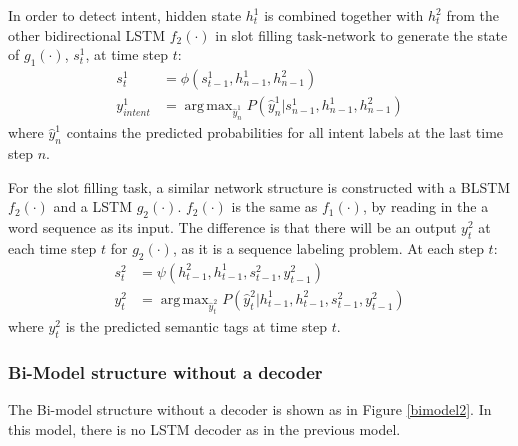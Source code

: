 \documentclass[11pt,a4paper]{article}
\DeclareMathOperator*{\argmax}{arg\,max}
\begin{document}
In order to detect intent, hidden state $h_t^1$ is combined together with $h_t^2$ from the other bidirectional LSTM $f_2(\cdot)$ in slot filling task-network to generate the state of $g_1(\cdot)$, $s_t^1$, at time step $t$:
\begin{equation}
\begin{split}
s_t^1&=\phi(s_{t-1}^1,h^1_{n-1},h^2_{n-1})\\
y_{intent}^1&=\argmax_{\hat{y}_n^{1}} P(\hat{y}_n^{1}|s_{n-1}^1,h^1_{n-1},h^2_{n-1})
\end{split}
\label{RNNState}
\end{equation}
where $\hat{y}_n^{1}$ contains the predicted probabilities for all intent labels at the last time step $n$.

For the slot filling task, a similar network structure is constructed with a BLSTM $f_2(\cdot)$ and a LSTM $g_2(\cdot)$. $f_2(\cdot)$ is the same as $f_1(\cdot)$, by reading in the a word sequence as its input. The difference is that there will be an output $y_t^2$ at each time step $t$ for $g_2(\cdot)$, as it is a sequence labeling problem. At each step $t$:
\begin{equation}
\begin{split}
s^2_t&=\psi(h^2_{t-1},h^1_{t-1},s^2_{t-1},y_{t-1}^2)\\
y_t^2&=\argmax_{\hat{y}_t^{2}} P(\hat{y}_t^{2}|h^1_{t-1},h^2_{t-1},s^2_{t-1},y_{t-1}^2)
\end{split}
\label{RNN2State}
\end{equation}
where $y_t^2$ is the predicted semantic tags at time step $t$.
\subsubsection{Bi-Model structure without a decoder}
The Bi-model structure without a decoder is shown as in Figure \ref{bimodel2}. In this model, there is no LSTM decoder as in the previous model. 
\end{document}
